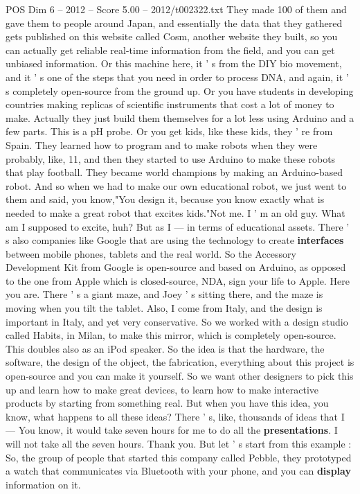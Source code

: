 \begin{textsample}{POS Dim 6 – 2012 – Score 5.00 – 2012/t002322.txt}
They made 100 of them and gave them to people around Japan, and essentially the data that they gathered gets published on this website called Cosm, another website they built, so you can actually get reliable real-time information from the field, and you can get unbiased information.
Or this machine here, it ' s from the DIY bio movement, and it ' s one of the steps that you need in order to process DNA, and again, it ' s completely open-source from the ground up.
Or you have students in developing countries making replicas of scientific instruments that cost a lot of money to make.
Actually they just build them themselves for a lot less using Arduino and a few parts.
This is a pH probe.
Or you get kids, like these kids, they ' re from Spain.
They learned how to program and to make robots when they were probably, like, 11, and then they started to use Arduino to make these robots that play football.
They became world champions by making an Arduino-based robot.
And so when we had to make our own educational robot, we just went to them and said, you know,"You design it, because you know exactly what is needed to make a great robot that excites kids."Not me.
I ' m an old guy.
What am I supposed to excite, huh?
But as I — in terms of educational assets.
There ' s also companies like Google that are using the technology to create \textbf{interfaces} between mobile phones, tablets and the real world.
So the Accessory Development Kit from Google is open-source and based on Arduino, as opposed to the one from Apple which is closed-source, NDA, sign your life to Apple.
Here you are.
There ' s a giant maze, and Joey ' s sitting there, and the maze is moving when you tilt the tablet.
Also, I come from Italy, and the design is important in Italy, and yet very conservative.
So we worked with a design studio called Habits, in Milan, to make this mirror, which is completely open-source.
This doubles also as an iPod speaker.
So the idea is that the hardware, the software, the design of the object, the fabrication, everything about this project is open-source and you can make it yourself.
So we want other designers to pick this up and learn how to make great devices, to learn how to make interactive products by starting from something real.
But when you have this idea, you know, what happens to all these ideas?
There ' s, like, thousands of ideas that I — You know, it would take seven hours for me to do all the \textbf{presentations}.
I will not take all the seven hours.
Thank you.
But let ' s start from this example : So, the group of people that started this company called Pebble, they prototyped a watch that communicates via Bluetooth with your phone, and you can \textbf{display} information on it.

\end{textsample}
